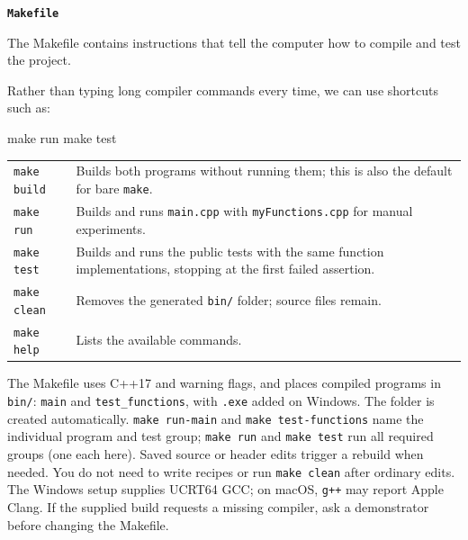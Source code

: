 \documentclass{csc2059practical}
\begin{document}
\begin{infobox}
\textbf{\texttt{Makefile}}

The Makefile contains instructions that tell the computer how to compile and test the project.

Rather than typing long compiler commands every time, we can use shortcuts such as:

\begin{bashcode}
make run
make test
\end{bashcode}

\begin{tabularx}{\linewidth}{@{}l X@{}}
\texttt{make build} & Builds both programs without running them; this is also the default for bare \texttt{make}.\\
\texttt{make run} & Builds and runs \texttt{main.cpp} with \texttt{myFunctions.cpp} for manual experiments.\\
\texttt{make test} & Builds and runs the public tests with the same function implementations, stopping at the first failed assertion.\\
\texttt{make clean} & Removes the generated \texttt{bin/} folder; source files remain.\\
\texttt{make help} & Lists the available commands.\\
\end{tabularx}

The Makefile uses C++17 and warning flags, and places compiled programs in \texttt{bin/}: \texttt{main} and \texttt{test\_functions}, with \texttt{.exe} added on Windows. The folder is created automatically. \texttt{make run-main} and \texttt{make test-functions} name the individual program and test group; \texttt{make run} and \texttt{make test} run all required groups (one each here). Saved source or header edits trigger a rebuild when needed. You do not need to write recipes or run \texttt{make clean} after ordinary edits. The Windows setup supplies UCRT64 GCC; on macOS, \texttt{g++} may report Apple Clang. If the supplied build requests a missing compiler, ask a demonstrator before changing the Makefile.
\end{infobox}
\end{document}
